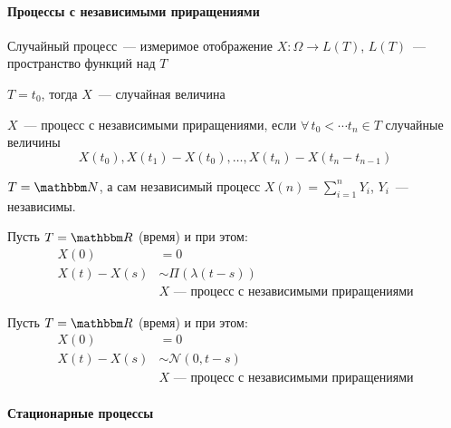 \documentclass[12pt, timbord]{../../../notes}
\begin{document}
\paragraph{Процессы с независимыми приращениями}
\label{par:proc::indep}

\begin{defn}\label{defn:proc::indep}
  Случайный процесс~--- измеримое отображение $X \colon \Omega \to L(T)$, $L(T)$~--- пространство функций над $T$
\end{defn}
\begin{exmp}\label{exmp:proc::indep::point}
  $T = {t_0}$, тогда $X$~--- случайная величина
\end{exmp}

\begin{defn}\label{defn:proc::indep::ind}
  $X$~--- процесс с независимыми приращениями, если $\forall\, t_0 < \cdots t_n \in T$ случайные величины 
  \[
    X(t_0), X(t_1) - X(t_0), \dotsc, X(t_n) - X(t_n - t_{n-1})
  \]
\end{defn}

\begin{exmp}\label{exmp:proc::indep::N}
  $T = \N$, а сам независимый процесс $X(n) = \sum_{i=1}^n Y_i$, $Y_i$~--- независимы.
\end{exmp}

\begin{defn}\label{defn:proc::indep::pois}
  Пусть $T = \R$ (время) и при этом:
  \begin{align*}
    X(0) &= 0 \\
    X(t) - X(s) &\sim \Pi(\lambda(t-s)) \\
                &X \text{~--- процесс с независимыми приращениями}
  \end{align*}
\end{defn}
\begin{defn}\label{defn:proc::indep::viner}
  Пусть $T = \R$ (время) и при этом:
  \begin{align*}
    X(0) &= 0 \\
    X(t) - X(s) &\sim \mathcal N (0, t-s) \\
                &X \text{~--- процесс с независимыми приращениями}
  \end{align*}
\end{defn}

\paragraph{Стационарные процессы}
\label{par:proc::const}
\end{document}
